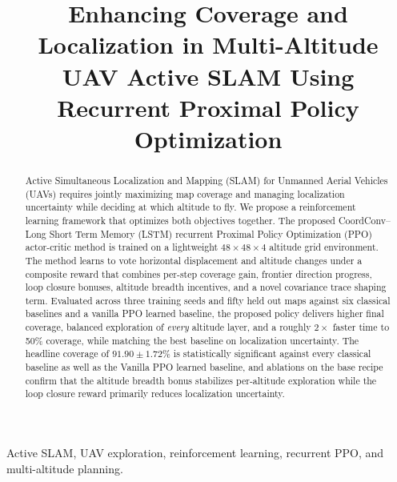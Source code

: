 \documentclass[conference]{IEEEtran}
\begin{document}
\title{\huge Enhancing Coverage and Localization in Multi-Altitude UAV Active SLAM Using Recurrent Proximal Policy Optimization}


\maketitle

\begin{abstract}
Active Simultaneous Localization and Mapping (SLAM) for Unmanned Aerial Vehicles (UAVs) requires jointly maximizing map coverage and managing localization uncertainty while deciding at which altitude to fly. We propose a reinforcement learning framework that optimizes both objectives together. The proposed CoordConv--Long Short Term Memory (LSTM) recurrent Proximal Policy Optimization (PPO) actor-critic method is trained on a lightweight $48{\times}48{\times}4$ altitude grid environment. The method learns to vote horizontal displacement and altitude changes under a composite reward that combines per-step coverage gain, frontier direction progress, loop closure bonuses, altitude breadth incentives, and a novel covariance trace shaping term. Evaluated across three training seeds and fifty held out maps against six classical baselines and a vanilla PPO learned baseline, the proposed policy delivers higher final coverage, balanced exploration of \emph{every} altitude layer, and a roughly $2{\times}$ faster time to 50\% coverage, while matching the best baseline on localization uncertainty. The headline coverage of $\mathbf{91.90 \pm 1.72\%}$ is statistically significant against every classical baseline as well as the Vanilla PPO learned baseline, and ablations on the base recipe confirm that the altitude breadth bonus stabilizes per-altitude exploration while the loop closure reward primarily reduces localization uncertainty.
\end{abstract}

\begin{IEEEkeywords}
Active SLAM, UAV exploration, reinforcement learning, recurrent PPO, and multi-altitude planning.
\end{IEEEkeywords}

\end{document}
